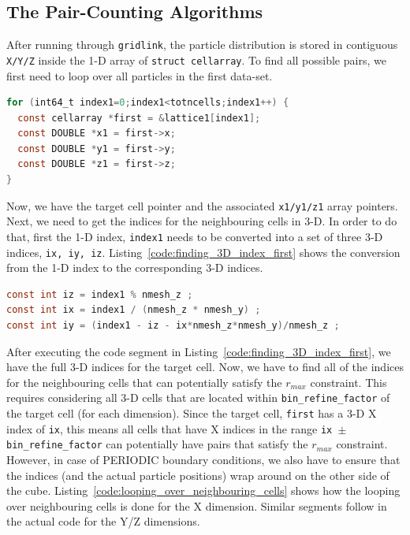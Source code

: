 \documentclass[12pt,titlepage,justified]{article}
\newcommand{\rmax}{\ensuremath{{r_{max}}}\xspace}
\begin{document}
\subsection{The Pair-Counting Algorithms}
After running through \texttt{gridlink}, the particle distribution is stored in contiguous \texttt{X/Y/Z} inside the 1-D array of \texttt{struct cellarray}. To find all 
possible pairs, we first need to loop over all particles in the first data-set. 
\begin{lstlisting}[language=C,numbers=none,label={code:loop_over_first_cells},caption={Looping over all cells in the first data-set.},basicstyle=\scriptsize]
for (int64_t index1=0;index1<totncells;index1++) {
  const cellarray *first = &lattice1[index1];
  const DOUBLE *x1 = first->x;
  const DOUBLE *y1 = first->y;
  const DOUBLE *z1 = first->z;
}
\end{lstlisting}
Now, we have the target cell pointer and the associated \texttt{x1/y1/z1} array pointers. Next, we need to get the indices for the neighbouring cells in 3-D. In order to do that, first 
the 1-D index, \texttt{index1} needs to be converted into a set of three 3-D indices, \texttt{ix, iy, iz}. Listing~\ref{code:finding_3D_index_first} shows the conversion from 
the 1-D index to the corresponding 3-D indices. 
\begin{lstlisting}[language=C,numbers=none,label={code:finding_3D_index_first},caption={Reconstructing 3-D index for \texttt{first} cell in the first data-set.},basicstyle=\scriptsize]
const int iz = index1 % nmesh_z ;
const int ix = index1 / (nmesh_z * nmesh_y) ;
const int iy = (index1 - iz - ix*nmesh_z*nmesh_y)/nmesh_z ;
\end{lstlisting}
After executing the code segment in Listing~\ref{code:finding_3D_index_first}, we have the full 3-D indices for the target cell. Now, we have to find all of the indices 
for the neighbouring cells that can potentially satisfy the \rmax constraint. This requires considering all 3-D cells that are located within \texttt{bin\_refine\_factor} of 
the target cell (for each dimension). Since the target cell, \texttt{first} has a 3-D X index of \texttt{ix}, this means all cells that have X indices in the range 
\texttt{ix $\pm$ bin\_refine\_factor} can potentially have pairs that satisfy the \rmax constraint. However, in case of PERIODIC boundary conditions, we also have 
to ensure that the indices (and the actual particle positions) wrap around on the other side of the cube. Listing~\ref{code:looping_over_neighbouring_cells} shows 
how the looping over neighbouring cells is done for the X dimension. Similar segments follow in the actual code for the Y/Z dimensions. 
\end{document}
